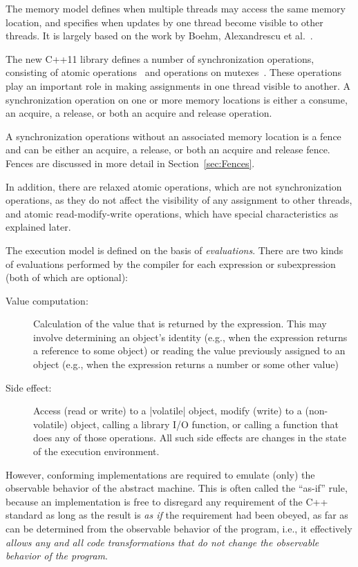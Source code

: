 \documentclass[a4paper,12pt,notitlepage,twoside,openright]{article}
\begin{document}
The memory model defines when multiple threads may access the same
memory location, and specifies when updates by one thread become
visible to other threads. It is largely based on the work by Boehm,
Alexandrescu et
al.~\cite{Boehm:2008:FCC:1379022.1375591,Alexandrescu:2004}.

The new C++11 library defines a number of synchronization operations,
consisting of atomic operations~\cite[29, pp. 1100]{c++11_standard}
and operations on mutexes~\cite[30, pp. 1118]{c++11_standard}. These
operations play an important role in making assignments in one thread
visible to another. A synchronization operation on one or more memory
locations is either a consume, an acquire, a release, or both an
acquire and release operation.

A synchronization operations without an associated memory location is
a fence and can be either an acquire, a release, or both an acquire
and release fence. Fences are discussed in more detail in
Section~\ref{sec:Fences}.

In addition, there are relaxed atomic operations, which are not
synchronization operations, as they do not affect the visibility of
any assignment to other threads, and atomic read-modify-write
operations, which have special characteristics as explained later.

The execution model is defined on the basis of \emph{evaluations}.
There are two kinds of evaluations performed by the compiler for each
expression or subexpression (both of which are optional):
\begin{description}
	\item[Value computation:] Calculation of the value that is
          returned by the expression. This may involve determining an
          object's identity (e.g., when the expression returns a
          reference to some object) or reading the value previously
          assigned to an object (e.g., when the expression returns a
          number or some other value)
	\item[Side effect:] Access (read or write) to a |volatile| object,
          modify (write) to a (non-volatile) object, calling a
          library I/O function, or calling a function that does any of
          those operations. All such side effects are changes in the
          state of the execution environment.
\end{description}

However, conforming implementations are required to emulate (only) the
observable behavior of the abstract machine. This is often called the
``as-if'' rule, because an implementation is free to disregard any
requirement of the C++ standard as long as the result is \emph{as if}
the requirement had been obeyed, as far as can be determined from the
observable behavior of the program, i.e., it effectively \emph{allows
any and all code transformations that do not change the observable
behavior of the program}.
\end{document}
